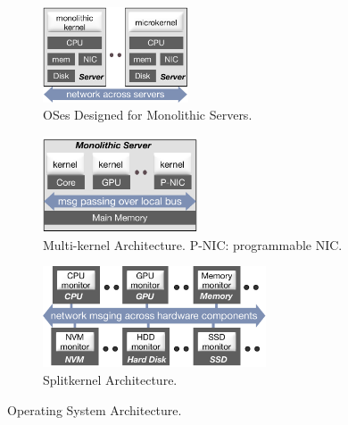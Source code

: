{
\begin{figure}[t]
\begin{subfigure}{1.7in}
\begin{center}
\centerline{\includegraphics[width=1.7in]{lego/Figures/monolithic-arch.pdf}}
\caption[Monolithic OS.]{OSes Designed for Monolithic Servers.}
\label{fig-monolithic}
\end{center}
\end{subfigure}
\begin{minipage}{0.05in}
\hspace{0.05in}
\end{minipage}
\begin{subfigure}{1.8in}
\begin{center}
\centerline{\includegraphics[width=1.8in]{lego/Figures/multikernel-arch.pdf}}
\caption[Multikernel Architecture.]{Multi-kernel Architecture. \small{P-NIC: programmable NIC.}}
\label{fig-multikernel}
\end{center}
\end{subfigure}
\begin{minipage}{0.05in}
\hspace{0.05in}
\end{minipage}
\begin{subfigure}{2.5in}
\begin{center}
\centerline{\includegraphics[width=2.6in]{lego/Figures/lego-arch.pdf}}
\caption[Splitkernel Architecture.]{Splitkernel Architecture.}
\label{fig-splitkernel}
\end{center}
\end{subfigure}
\caption[Operating System Architecture.]{Operating System Architecture.}
\end{figure}
}